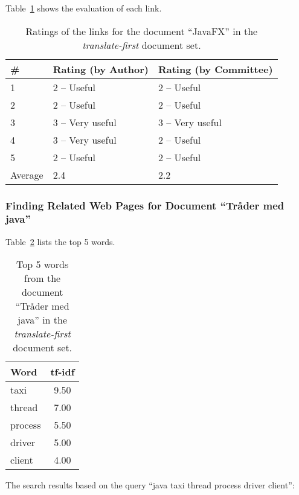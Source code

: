 Table~\ref{tab:ratings-en-javafx-2} shows the evaluation of each link.
\begin{table}[H]
\centering
\begin{tabular}{|l|l|l|}
\hline\hline
    \# & Rating (by Author) & Rating (by Committee) \\
\hline
    1 & 2 -- Useful & 2 -- Useful \\
    2 & 2 -- Useful & 2 -- Useful \\
    3 & 3 -- Very useful & 3 -- Very useful \\
    4 & 3 -- Very useful & 2 -- Useful \\
    5 & 2 -- Useful & 2 -- Useful \\
\hline
    Average & 2.4 & 2.2 \\
\hline\hline
\end{tabular}
\caption{Ratings of the links for the document ``JavaFX'' in the \textit{translate-first} document set.}
\label{tab:ratings-en-javafx-2}
\end{table}


\subsubsection{Finding Related Web Pages for Document ``Tråder med java''}
\label{subsubsec:no-tr-der-med-java-2}

Table~\ref{tab:topWords-en-tr-der-med-java-2} lists the top 5 words.
\begin{table}[H]
\centering
\begin{tabular}{|l|c|}
\hline\hline
    Word & tf-idf \\
\hline
    taxi & 9.50 \\
    thread & 7.00 \\
    process & 5.50 \\
    driver & 5.00 \\
    client & 4.00 \\
\hline\hline
\end{tabular}
\caption{Top 5 words from the document ``Tråder med java'' in the \textit{translate-first} document set.}
\label{tab:topWords-en-tr-der-med-java-2}
\end{table}

The search results based on the query ``java taxi thread process driver client'':

